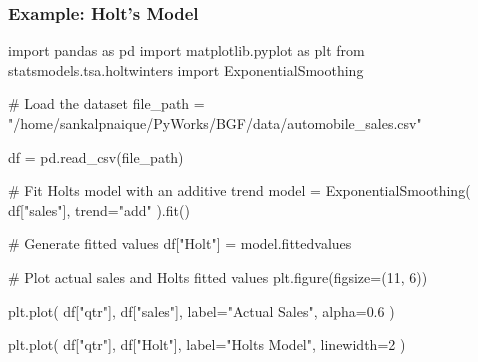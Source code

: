 \documentclass[
  a4paper,
]{article}
\newenvironment{Shaded}{\begin{snugshade}}{\end{snugshade}}
\newcommand{\CommentTok}[1]{\textcolor[rgb]{0.37,0.37,0.37}{#1}}
\newcommand{\DecValTok}[1]{\textcolor[rgb]{0.68,0.00,0.00}{#1}}
\newcommand{\FloatTok}[1]{\textcolor[rgb]{0.68,0.00,0.00}{#1}}
\newcommand{\ImportTok}[1]{\textcolor[rgb]{0.00,0.46,0.62}{#1}}
\newcommand{\NormalTok}[1]{\textcolor[rgb]{0.00,0.23,0.31}{#1}}
\newcommand{\OperatorTok}[1]{\textcolor[rgb]{0.37,0.37,0.37}{#1}}
\newcommand{\StringTok}[1]{\textcolor[rgb]{0.13,0.47,0.30}{#1}}
\begin{document}
\subsubsection{Example: Holt's Model}\label{example-holts-model}

\begin{tcolorbox}[enhanced jigsaw, arc=.35mm, bottomrule=.15mm, bottomtitle=1mm, breakable, colback=white, colbacktitle=quarto-callout-tip-color!10!white, colframe=quarto-callout-tip-color-frame, coltitle=black, left=2mm, leftrule=.75mm, opacityback=0, opacitybacktitle=0.6, rightrule=.15mm, title=\textcolor{quarto-callout-tip-color}{\faLightbulb}\hspace{0.5em}{💻 Coding Session}, titlerule=0mm, toprule=.15mm, toptitle=1mm]

\begin{Shaded}
\begin{Highlighting}[]
\ImportTok{import}\NormalTok{ pandas }\ImportTok{as}\NormalTok{ pd}
\ImportTok{import}\NormalTok{ matplotlib.pyplot }\ImportTok{as}\NormalTok{ plt}
\ImportTok{from}\NormalTok{ statsmodels.tsa.holtwinters }\ImportTok{import}\NormalTok{ ExponentialSmoothing}

\CommentTok{\# Load the dataset}
\NormalTok{file\_path }\OperatorTok{=} \StringTok{"/home/sankalpnaique/PyWorks/BGF/data/automobile\_sales.csv"}

\NormalTok{df }\OperatorTok{=}\NormalTok{ pd.read\_csv(file\_path)}

\CommentTok{\# Fit Holt\textquotesingle{}s model with an additive trend}
\NormalTok{model }\OperatorTok{=}\NormalTok{ ExponentialSmoothing(}
\NormalTok{    df[}\StringTok{"sales"}\NormalTok{],}
\NormalTok{    trend}\OperatorTok{=}\StringTok{"add"}
\NormalTok{).fit()}

\CommentTok{\# Generate fitted values}
\NormalTok{df[}\StringTok{"Holt"}\NormalTok{] }\OperatorTok{=}\NormalTok{ model.fittedvalues}

\CommentTok{\# Plot actual sales and Holt\textquotesingle{}s fitted values}
\NormalTok{plt.figure(figsize}\OperatorTok{=}\NormalTok{(}\DecValTok{11}\NormalTok{, }\DecValTok{6}\NormalTok{))}

\NormalTok{plt.plot(}
\NormalTok{    df[}\StringTok{"qtr"}\NormalTok{],}
\NormalTok{    df[}\StringTok{"sales"}\NormalTok{],}
\NormalTok{    label}\OperatorTok{=}\StringTok{"Actual Sales"}\NormalTok{,}
\NormalTok{    alpha}\OperatorTok{=}\FloatTok{0.6}
\NormalTok{)}

\NormalTok{plt.plot(}
\NormalTok{    df[}\StringTok{"qtr"}\NormalTok{],}
\NormalTok{    df[}\StringTok{"Holt"}\NormalTok{],}
\NormalTok{    label}\OperatorTok{=}\StringTok{"Holt\textquotesingle{}s Model"}\NormalTok{,}
\NormalTok{    linewidth}\OperatorTok{=}\DecValTok{2}
\NormalTok{)}


\end{Highlighting}
\end{Shaded}
\end{tcolorbox}
\end{document}
